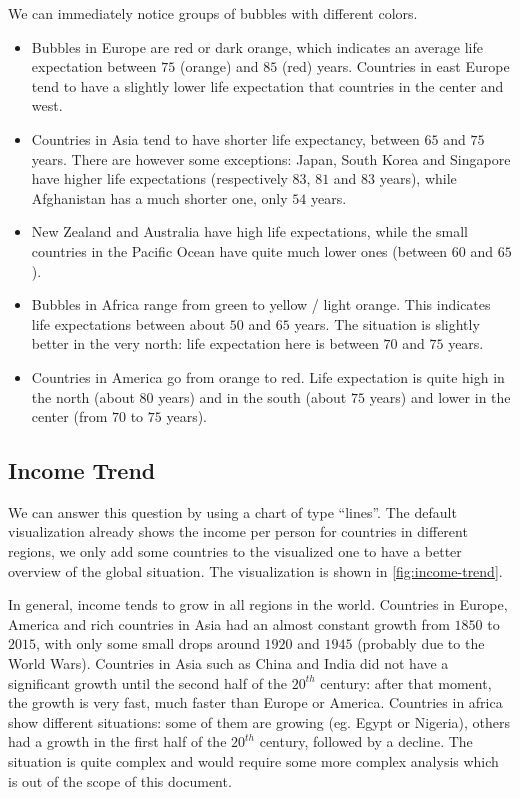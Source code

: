We can immediately notice groups of bubbles with different colors.
\begin{itemize}
	\item Bubbles in Europe are red or dark orange, which indicates an average life expectation between $75$ (orange) and $85$ (red) years.	Countries in east Europe tend to have a slightly lower life expectation that countries in the center and west.
	\item Countries in Asia tend to have shorter life expectancy, between $65$ and $75$ years. There are however some exceptions: Japan, South Korea and Singapore have higher life expectations (respectively $83$, $81$ and $83$ years), while Afghanistan has a much shorter one, only $54$ years.
	\item New Zealand and Australia have high life expectations, while the small countries in the Pacific Ocean have quite much lower ones (between $60$ and $65$).
	\item Bubbles in Africa range from green to yellow / light orange. This indicates life expectations between about $50$ and $65$ years. The situation is slightly better in the very north: life expectation here is between $70$ and $75$ years.
	\item Countries in America go from orange to red. Life expectation is quite high in the north (about $80$ years) and in the south (about $75$ years) and lower in the center (from $70$ to $75$ years).
\end{itemize}


\subsection{Income Trend}
We can answer this question by using a chart of type ``lines''.
The default visualization already shows the income per person for countries in different regions,
we only add some countries to the visualized one to have a better overview of the global situation.
The visualization is shown in \cref{fig:income-trend}.

In general, income tends to grow in all regions in the world.
Countries in Europe, America and rich countries in Asia had an almost constant growth from $1850$ to $2015$, with only some small drops around $1920$ and $1945$ (probably due to the World Wars).
Countries in Asia such as China and India did not have a significant growth until the second half of the $20^{th}$ century:
after that moment, the growth is very fast, much faster than Europe or America.
Countries in africa show different situations:
some of them are growing (eg. Egypt or Nigeria), others had a growth in the first half of the $20^{th}$ century, followed by a decline.
The situation is quite complex and would require some more complex analysis which is out of the scope of this document.

